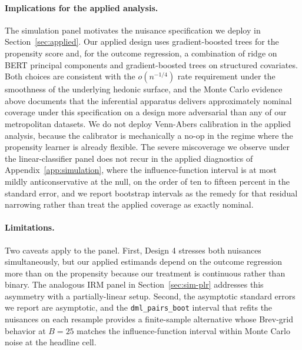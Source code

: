 \paragraph{Implications for the applied analysis.} The simulation
panel motivates the nuisance specification we deploy in
Section~\ref{sec:applied}. Our applied design uses gradient-boosted
trees for the propensity score and, for the outcome regression, a
combination of ridge on BERT principal components and gradient-boosted
trees on structured covariates. Both choices are consistent with the
$o(n^{-1/4})$ rate requirement under the smoothness of the underlying
hedonic surface, and the Monte Carlo evidence above documents that the
inferential apparatus delivers approximately nominal coverage under
this specification on a design more adversarial than any of our
metropolitan datasets. We do not deploy Venn-Abers calibration in the
applied analysis, because the calibrator is mechanically a no-op in
the regime where the propensity learner is already flexible. The severe
miscoverage we observe under the linear-classifier panel does not recur in
the applied diagnostics of Appendix~\ref{app:simulation}, where the
influence-function interval is at most mildly anticonservative at the null,
on the order of ten to fifteen percent in the standard error, and we report
bootstrap intervals as the remedy for that residual narrowing rather than
treat the applied coverage as exactly nominal.

\paragraph{Limitations.} Two caveats apply to the panel.  First,
Design 4 stresses both nuisances simultaneously, but our applied
estimands depend on the outcome regression more than on the
propensity because our treatment is continuous rather than binary.
The analogous IRM panel in Section~\ref{sec:sim-plr} addresses this
asymmetry with a partially-linear setup.  Second, the asymptotic
standard errors we report are asymptotic, and the
\texttt{dml\_pairs\_boot} interval that refits the nuisances on each
resample provides a finite-sample alternative whose Brev-grid
behavior at $B = 25$ matches the influence-function interval within
Monte Carlo noise at the headline cell.

